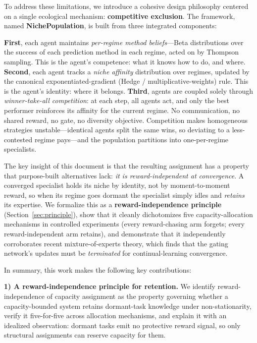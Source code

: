 \documentclass[11pt]{article}
\begin{document}
To address these limitations, we introduce a cohesive design philosophy centered
on a single ecological mechanism: \textbf{competitive exclusion}. The framework,
named \textbf{NichePopulation}, is built from three integrated components:

\textbf{First}, each agent maintains \emph{per-regime method beliefs}---Beta
distributions over the success of each prediction method in each regime, acted
on by Thompson sampling. This is the agent's competence: what it knows how to do,
and where. \textbf{Second}, each agent tracks a \emph{niche affinity}
distribution over regimes, updated by the canonical exponentiated-gradient
(Hedge / multiplicative-weights) rule. This is the agent's identity: where it
belongs. \textbf{Third}, agents are coupled solely through \emph{winner-take-all
competition}: at each step, all agents act, and only the best performer
reinforces its affinity for the current regime. No communication, no shared
reward, no gate, no diversity objective. Competition makes homogeneous strategies
unstable---identical agents split the same wins, so deviating to a less-contested
regime pays---and the population partitions into one-per-regime specialists.

The key insight of this document is that the resulting assignment has a property
that purpose-built alternatives lack: \emph{it is reward-independent at
convergence}. A converged specialist holds its niche by identity, not by
moment-to-moment reward, so when its regime goes dormant the specialist simply
idles and \emph{retains} its expertise. We formalize this as a
\textbf{reward-independence principle} (Section~\ref{sec:principle}), show that
it cleanly dichotomizes five capacity-allocation mechanisms in controlled
experiments (every reward-chasing arm forgets; every reward-independent arm
retains), and demonstrate that it independently corroborates recent
mixture-of-experts theory, which finds that the gating network's updates must be
\emph{terminated} for continual-learning convergence.

In summary, this work makes the following key contributions:

\textbf{1) A reward-independence principle for retention.} We identify
reward-independence of capacity assignment as the property governing whether a
capacity-bounded system retains dormant-task knowledge under non-stationarity,
verify it five-for-five across allocation mechanisms, and explain it with an
idealized observation: dormant tasks emit no protective reward signal, so only
structural assignments can reserve capacity for them.
\end{document}
